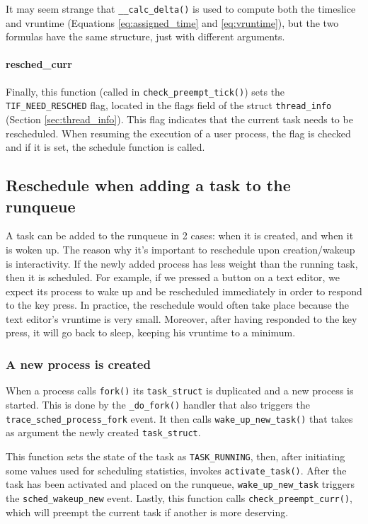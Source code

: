 It may seem strange that \verb|__calc_delta()| is used to compute both the timeslice and vruntime (Equations \ref{eq:assigned_time} and \ref{eq:vruntime}), but the two formulas have the same structure, just with different arguments.

\paragraph{resched\_curr}\label{trace:wake_idle_without_ipi}
Finally, this function (called in \verb|check_preempt_tick()|) sets the \verb|TIF_NEED_RESCHED| flag, located in the flags field of the struct \verb|thread_info| (Section \ref{sec:thread_info}). 
This flag indicates that the current task needs to be rescheduled. When resuming the execution of a user process, the flag is checked and if it is set, the schedule function is called.

\subsection{Reschedule when adding a task to the runqueue}
A task can be added to the runqueue in 2 cases: when it is created, and when it is woken up. The reason why it's important to reschedule upon creation/wakeup is interactivity. If the newly added process has less weight than the running task, then it is scheduled. For example, if we pressed a button on a text editor, we expect its process to wake up and be rescheduled immediately in order to respond to the key press. In practice, the reschedule would often take place because the text editor's vruntime is very small. Moreover, after having responded to the key press, it will go back to sleep, keeping his vruntime to a minimum.

\subsubsection{A new process is created}
When a process calls \verb|fork()| its \verb|task_struct| is duplicated and a new process is started. This is done by the \verb|_do_fork()| handler that also triggers the \verb|trace_sched_process_fork|\label{trace:sched_process_fork} event. It then calls \verb|wake_up_new_task()| that takes as argument the newly created \verb|task_struct|. 

This function sets the state of the task as \verb|TASK_RUNNING|, then, after initiating some values used for scheduling statistics, invokes \verb|activate_task()|. After the task has been activated and placed on the runqueue, \verb|wake_up_new_task| triggers the \verb|sched_wakeup_new| \label{trace:sched_wakeup_new} event. Lastly, this function calls \verb|check_preempt_curr()|, which will preempt the current task if another is more deserving. 

